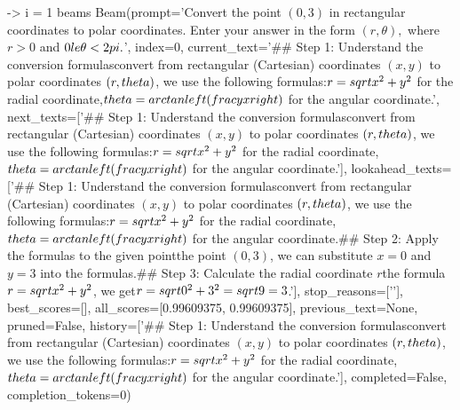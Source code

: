 -> i = 1
beams
Beam(prompt='Convert the point $(0,3)$ in rectangular coordinates to polar coordinates.  Enter your answer in the form $(r,\theta),$ where $r > 0$ and $0 \\le \theta < 2 \\pi.$', index=0, current_text='## Step 1: Understand the conversion formulas\nTo convert from rectangular (Cartesian) coordinates $(x, y)$ to polar coordinates $(r, \\theta)$, we use the following formulas:\n$r = \\sqrt{x^2 + y^2}$ for the radial coordinate,\n$\\theta = \\arctan\\left(\\frac{y}{x}\\right)$ for the angular coordinate.\n\n', next_texts=['## Step 1: Understand the conversion formulas\nTo convert from rectangular (Cartesian) coordinates $(x, y)$ to polar coordinates $(r, \\theta)$, we use the following formulas:\n$r = \\sqrt{x^2 + y^2}$ for the radial coordinate,\n$\\theta = \\arctan\\left(\\frac{y}{x}\\right)$ for the angular coordinate.\n\n'], lookahead_texts=['## Step 1: Understand the conversion formulas\nTo convert from rectangular (Cartesian) coordinates $(x, y)$ to polar coordinates $(r, \\theta)$, we use the following formulas:\n$r = \\sqrt{x^2 + y^2}$ for the radial coordinate,\n$\\theta = \\arctan\\left(\\frac{y}{x}\\right)$ for the angular coordinate.\n\n## Step 2: Apply the formulas to the given point\nGiven the point $(0, 3)$, we can substitute $x = 0$ and $y = 3$ into the formulas.\n\n## Step 3: Calculate the radial coordinate $r$\nUsing the formula $r = \\sqrt{x^2 + y^2}$, we get\n$r = \\sqrt{0^2 + 3^2} = \\sqrt{9} = 3$.\n\n'], stop_reasons=['\n\n'], best_scores=[], all_scores=[0.99609375, 0.99609375], previous_text=None, pruned=False, history=['## Step 1: Understand the conversion formulas\nTo convert from rectangular (Cartesian) coordinates $(x, y)$ to polar coordinates $(r, \\theta)$, we use the following formulas:\n$r = \\sqrt{x^2 + y^2}$ for the radial coordinate,\n$\\theta = \\arctan\\left(\\frac{y}{x}\\right)$ for the angular coordinate.\n\n'], completed=False, completion_tokens=0)
